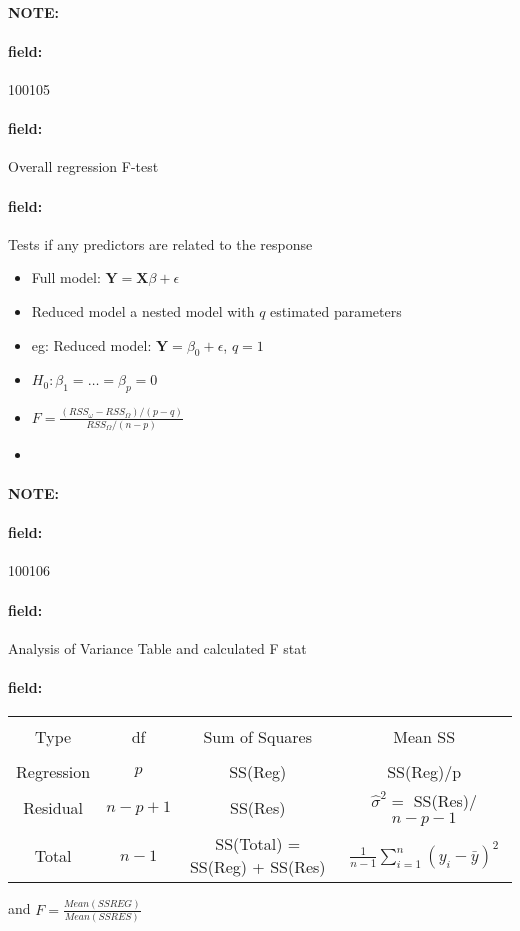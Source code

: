 \documentclass[12pt]{article}
\newenvironment{note}{\paragraph{NOTE:}}{}
\newenvironment{field}{\paragraph{field:}}{}
\begin{document}
\begin{note} \begin{field} \tiny 100105 \end{field}
 \begin{field}
  Overall regression F-test
 \end{field}
 \begin{field}
  Tests if any predictors are related to the response
  \begin{itemize}
   \item Full model: $\mathbf{Y} = \mathbf{X}\beta + \epsilon$
   \item Reduced model a nested model with $q$ estimated parameters
   \item eg: Reduced model: $\mathbf{Y} = \beta_0 + \epsilon$, $q = 1$
   \item $H_0: \beta_1 =  \ldots = \beta_p = 0$
   \item $F = \frac{(RSS_\omega - RSS_\Omega)/(p-q)}{RSS_\Omega/(n-p)}$
   \item
  \end{itemize}
 \end{field}
\end{note}

\begin{note} \begin{field} \tiny 100106 \end{field}
 \begin{field}
  Analysis of Variance Table and calculated F stat
 \end{field}
 \begin{field}
  \begin{tabular}{|c|c|c|c|}
   \hline                                                                                                \\
   Type       & df      & Sum of Squares                & Mean SS                                        \\
   \hline                                                                                                \\
   Regression & $p$     & SS(Reg)                       & SS(Reg)/p                                      \\
   Residual   & $n-p+1$ & SS(Res)                       & $\hat{\sigma}^2 =$ SS(Res)/$n-p-1$             \\
   Total      & $n-1$   & SS(Total) = SS(Reg) + SS(Res) & $\frac{1}{n-1} \sum_{i=1}^n (y_i - \bar{y})^2$ \\
   \hline
  \end{tabular}
  and $F = \frac{Mean(SSREG)}{Mean(SSRES)}$
 \end{field}
\end{note}
\end{document}
